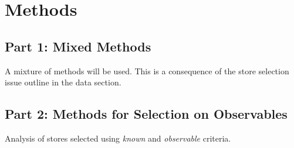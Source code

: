 \documentclass[12pt,letterpaperpaper,]{book}
\begin{document}
\section{Methods}\label{methods-1}

\subsection*{Part 1: Mixed Methods}\label{part-1-mixed-methods}

A mixture of methods will be used. This is a consequence of the store
selection issue outline in the data section.

\subsection*{Part 2: Methods for Selection on
Observables}\label{part-2-methods-for-selection-on-observables}

Analysis of stores selected using \emph{known} and \emph{observable}
criteria.
\end{document}
